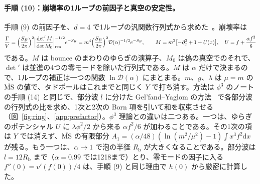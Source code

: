 \documentclass[a4paper,10pt]{ltjsarticle}
\newcommand{\dd}{\mathrm{d}}
\begin{document}
\paragraph{手順 (10)：崩壊率の1ループの前因子と真空の安定性。}手順 (9) の前因子を、$d=4$ で1ループの汎関数行列式から求めた~\cite{callancoleman}。崩壊率は
\begin{equation}
\frac{\Gamma}{V}=\Bigl(\frac{S_B}{2\pi}\Bigr)^2\Bigl|\frac{\det'M}{\det M_0}\Bigr|_{\mathrm{ren}}^{-1/2}e^{-S_B}
=m^4\Bigl(\frac{S_B}{2\pi}\Bigr)^2\mathcal D(\alpha)^{-1/2}e^{-S_B},\qquad
M=m^2\bigl[-\partial_x^2+1+U(x)\bigr],\quad U=f+\frac{\alpha f^2}{6}
\label{eq:rate}
\end{equation}
である。$M$ は bounce のまわりのゆらぎの演算子、$M_0$ は偽の真空でのそれで、$\det'$ は並進の4つの零モードを除いた行列式である。$M$ は $\alpha$ だけで決まるので、1ループの補正は一つの関数 $\ln\mathcal D(\alpha)$ にまとまる。$m$、$g$、$\lambda$ は $\mu=m$ の $\overline{\mathrm{MS}}$ の値で、タドポールはこれまでと同じく $Y$ で打ち消す。方法は $\phi^3$ のノートの手順 (14) と同じで、部分波 $l$ に分けた Gel'fand--Yaglom の方法~\cite{gy,dunnemin} で各部分波の行列式の比を求め、1次と2次の Born 項を引いて和を収束させる（図~\ref{fig:ring}、\ref{app:prefactor}）。$\phi^3$ 理論との違いは二つある。一つは、ゆらぎのポテンシャル $U$ に $\lambda\phi^2/2$ から来る $\alpha f^2/6$ が加わることである。その1次の項は $Y$ では消えず、$\overline{\mathrm{MS}}$ の有限部分 $A_1=(\alpha/48)(\ln(m^2/\mu^2)-1)\int x^3f^2\dd x$ が残る。もう一つは、$\alpha\to1$ で泡の半径 $R_{\mathrm b}$ が大きくなることである。部分波は $l=12R_{\mathrm b}$ まで（$\alpha=0.99$ では1218まで）とり、零モードの因子に入る $f''(0)=v'(f(0))/4$ は、手順 (9) と同じ理由で $h(0)$ から厳密に計算した。
\end{document}
